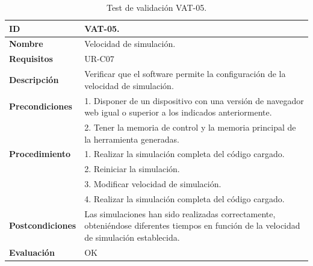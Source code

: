 \begin{center}
\begin{table}[htb]
\centering
\caption{Test de validación VAT-05.}
\begin{tabular}{@{}p{2.5cm} p{9cm}@{}} 
\toprule
\textbf{ID} 					& VAT-05. \\
\midrule
\textbf{Nombre} 				& Velocidad de simulación. \\
\midrule
\textbf{Requisitos} 		& UR-C07\\
\midrule
\textbf{Descripción} 		& Verificar que el \gls{software} permite la configuración de la velocidad de simulación. \\
\midrule
\textbf{Precondiciones}		& 1. Disponer de un dispositivo con una versión de navegador web igual o superior a los indicados anteriormente. \\
											& 2. Tener la memoria de control y la memoria principal de la herramienta generadas. \\
\midrule
\textbf{Procedimiento}		& 1. Realizar la simulación completa del código cargado.\\
											& 2. Reiniciar la simulación.\\
											& 3. Modificar velocidad de simulación. \\
											& 4. Realizar la simulación completa del código cargado.\\
\midrule
\textbf{Postcondiciones} 		&  Las simulaciones han sido realizadas correctamente, obteniéndose diferentes tiempos en función de la velocidad de simulación establecida.\\
\midrule
\textbf{Evaluación} 			& OK \\
\bottomrule
\end{tabular}
\label{tab:vat-05}
\end{table}
\end{center}

